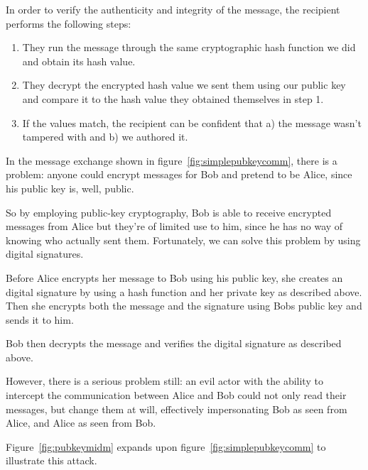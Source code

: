 In order to verify the authenticity and integrity of the message, the recipient performs the following steps:
\begin{enumerate}
    \item They run the message through the same cryptographic hash function we did and obtain its hash value.
    \item They decrypt the encrypted hash value we sent them using our public key and compare it to the hash value they obtained themselves in step 1.
    \item If the values match, the recipient can be confident that a) the message wasn't tampered with and b) we authored it.
\end{enumerate}

In the message exchange shown in figure~\ref{fig:simplepubkeycomm},
there is a problem: anyone could encrypt messages for Bob and pretend to be Alice, since his public key is, well, public.

So by employing public-key cryptography, Bob is able to receive encrypted messages from Alice but they're of limited use to him,
since he has no way of knowing who actually sent them.
Fortunately, we can solve this problem by using digital signatures.

Before Alice encrypts her message to Bob using his public key,
she creates an digital signature by using a hash function and her private key as described above.
Then she encrypts both the message and the signature using Bobs public key and sends it to him.

Bob then decrypts the message and verifies the digital signature as described above.

However, there is a serious problem still: an evil actor with the ability to intercept the communication
between Alice and Bob could not only read their messages,
but change them at will, effectively impersonating Bob as seen from Alice,
and Alice as seen from Bob.

Figure~\ref{fig:pubkeymidm} expands upon figure~\ref{fig:simplepubkeycomm} to illustrate this attack.

